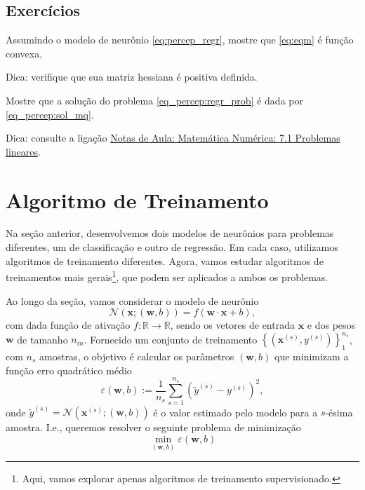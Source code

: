 \subsection{Exercícios}

\begin{exer}\label{exer:eqm_convexa}
  Assumindo o modelo de neurônio \eqref{eq:percep_regr}, mostre que \eqref{eq:eqm} é função convexa.
\end{exer}
\begin{resp}
  Dica: verifique que sua matriz hessiana é positiva definida.
\end{resp}

\begin{exer}\label{exer_percep:sol_mq}
  Mostre que a solução do problema \eqref{eq_percep:regr_prob} é dada por \eqref{eq_percep:sol_mq}.
\end{exer}
\begin{resp}
  Dica: consulte a ligação \href{https://notaspedrok.com.br/notas/MatematicaNumerica/cap_ajuste_sec_prob_lin.html}{Notas de Aula: Matemática Numérica: 7.1 Problemas lineares}.
\end{resp}

\emconstrucao

\section{Algoritmo de Treinamento}

Na seção anterior, desenvolvemos dois modelos de neurônios para problemas diferentes, um de classificação e outro de regressão. Em cada caso, utilizamos algoritmos de treinamento diferentes. Agora, vamos estudar algoritmos de treinamentos mais gerais\footnote{Aqui, vamos explorar apenas algoritmos de treinamento supervisionado.}, que podem ser aplicados a ambos os problemas.

Ao longo da seção, vamos considerar o modelo de neurônio
\begin{equation}
  \mathcal{N}\left(\pmb{x}; (\pmb{w}, b)\right) = f(\pmb{w}\cdot\pmb{x} + b),
\end{equation}
com dada função de ativação $f:\mathbb{R}\to\mathbb{R}$, sendo os vetores de entrada $\pmb{x}$ e dos pesos $\pmb{w}$ de tamanho $n_{in}$. Fornecido um conjunto de treinamento $\left\{\left(\pmb{x}^{(s)}, y^{(s)}\right)\right\}_1^{n_s}$, com $n_s$ amostras, o objetivo é calcular os parâmetros $(\pmb{w}, b)$ que minimizam a função erro quadrático médio
\begin{equation}
  \varepsilon(\pmb{w}, b) := \frac{1}{n_s}\sum_{s=1}^{n_s}\left(\tilde{y}^{(s)} - y^{(s)}\right)^2,
\end{equation}
onde $\tilde{y}^{(s)} = \mathcal{N}\left(\pmb{x}^{(s)}; (\pmb{w}, b)\right)$ é o valor estimado pelo modelo para a $s$-ésima amostra. I.e., queremos resolver o seguinte problema de minimização
\begin{equation}
  \min_{(\pmb{w}, b)}\varepsilon(\pmb{w}, b)
\end{equation}

